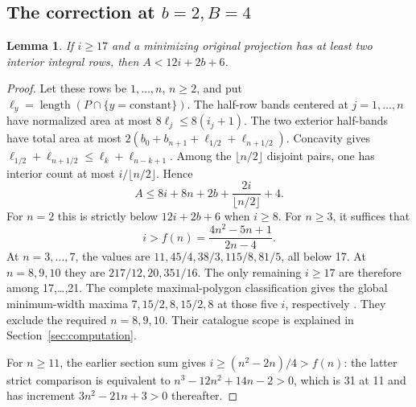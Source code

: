 \documentclass[11pt]{article}
\newtheorem{lemma}[theorem]{Lemma}
\begin{document}
\subsection{The correction at \texorpdfstring{\(b=2,B=4\)}{b=2, B=4}}
\begin{lemma}\label{lem:neararea}
If \(i\ge17\) and a minimizing original projection has at least two interior
integral rows, then \(A<12i+2b+6\).
\end{lemma}
\begin{proof}
Let these rows be \(1,\ldots,n\), \(n\ge2\), and put
\(\ell_y=\operatorname{length}(P\cap\{y=\text{constant}\})\).
The half-row bands centered at \(j=1,\ldots,n\) have normalized area at most
\(8\ell_j\le8(i_j+1)\). The two exterior half-bands have total area at most
\(2(b_0+b_{n+1}+\ell_{1/2}+\ell_{n+1/2})\).
Concavity gives
\(\ell_{1/2}+\ell_{n+1/2}\le\ell_k+\ell_{n-k+1}\).
Among the \(\lfloor n/2\rfloor\) disjoint pairs, one has interior count
at most \(i/\lfloor n/2\rfloor\). Hence
\begin{equation}\label{eq:neararea}
 A\le8i+8n+2b+\frac{2i}{\lfloor n/2\rfloor}+4.
\end{equation}
For \(n=2\) this is strictly below \(12i+2b+6\) when \(i\ge8\).
For \(n\ge3\), it suffices that
\[
 i>f(n)=\frac{4n^2-5n+1}{2n-4}.
\]
At \(n=3,\ldots,7\), the values are
\(11,45/4,38/3,115/8,81/5\), all below 17.
At \(n=8,9,10\) they are \(217/12,20,351/16\).
The only remaining \(i\ge17\) are therefore among 17,\ldots,21.
The complete maximal-polygon classification gives the global minimum-width
maxima \(7,15/2,8,15/2,8\) at those five \(i\), respectively
\cite[proof of Theorem 1.4, pp.\ 9--10]{Inequalities}.
They exclude the required \(n=8,9,10\).
Their catalogue scope is explained in Section~\ref{sec:computation}.

For \(n\ge11\), the earlier section sum gives \(i\ge(n^2-2n)/4>f(n)\):
the latter strict comparison is equivalent to
\(n^3-12n^2+14n-2>0\), which is 31 at 11 and has increment
\(3n^2-21n+3>0\) thereafter.
\end{proof}
\end{document}
